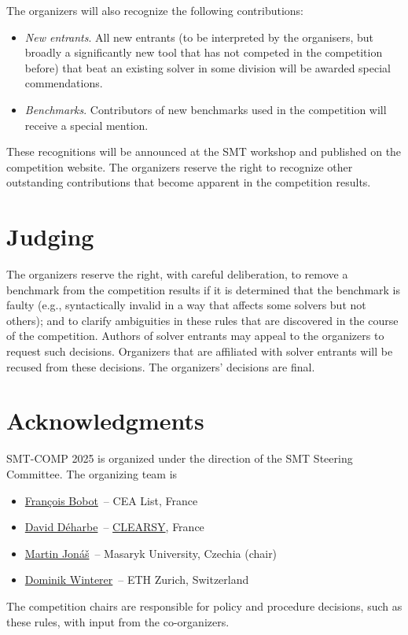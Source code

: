 \documentclass[12pt]{article}
\begin{document}
The organizers will also recognize the following contributions:
%
\begin{itemize}
\item \emph{New entrants}. All new entrants (to be interpreted by the organisers, but broadly a significantly new tool that has not competed in the competition before) that beat an existing solver in some division will be awarded special commendations.
\item \emph{Benchmarks}. Contributors of new benchmarks used in the competition will receive a special mention.
\end{itemize}
%
These recognitions will be announced at the SMT workshop and published on the competition website.
The organizers reserve the right to recognize other outstanding
contributions that become apparent in the competition results.



\section{Judging}

The organizers reserve the right, with careful deliberation, to remove
a benchmark from the competition results if it is determined that the
benchmark is faulty (e.g., syntactically invalid in a way that affects
some solvers but not others); and to clarify ambiguities in these
rules that are discovered in the course of the competition.  Authors
of solver entrants may appeal to the organizers to request such
decisions.  Organizers that are affiliated with solver entrants will
be recused from these decisions.  The organizers' decisions are final.


\section{Acknowledgments}

SMT-COMP 2025 is organized under the direction of the SMT Steering
Committee. The organizing team is
%
\begin{itemize}
\setlength{\itemsep}{0pt}
\item \href{https://github.com/bobot}{Fran\c{c}ois Bobot}~-- CEA List, France
\item \href{https://daviddeharbe.github.io}{David D\'{e}harbe}~-- \href{https://clearsy.com}{CLEARSY}, France
\item \href{https://www.muni.cz/en/people/359542-martin-jonas}{Martin Jon\'{a}\v{s}}~-- Masaryk University, Czechia (chair)
\item \href{https://wintered.github.io/}{Dominik Winterer}~-- ETH Zurich, Switzerland
\end{itemize}
%
The competition chairs are responsible for policy and procedure decisions,
such as these rules, with input from the co-organizers.
\end{document}
